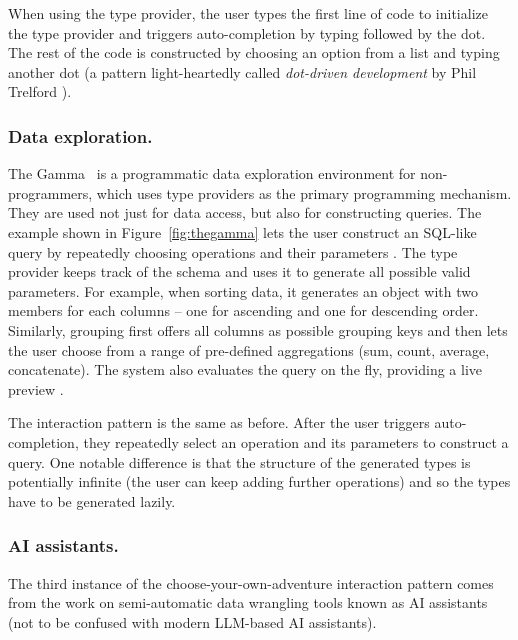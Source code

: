 \documentclass[nonacm,anonymous,sigplan,screen]{acmart}
\newcommand{\ident}[1]{\textsf{\color{DarkSlateBlue}{#1}}}
\begin{document}
When using the type provider, the user types the first line of code to initialize the type provider
and triggers auto-completion by typing \ident{wb} followed by the dot. The rest of the code is
constructed by choosing an option from a list and typing another dot (a pattern light-heartedly
called \emph{dot-driven development} by Phil Trelford \cite{seemann-2021-head}).


\subsubsection*{Data exploration.}

The Gamma~\cite{petricek-2022-thegamma} is a programmatic data exploration environment
for non-programmers, which uses type providers as the primary programming mechanism. They
are used not just for data access, but also for constructing queries.
The example shown in Figure~\ref{fig:thegamma} lets the user construct an SQL-like query by
repeatedly choosing operations and their parameters \cite{petricek-2017-dotdriven}. The type provider keeps track
of the schema and uses it to generate all possible valid parameters. For example, when sorting data, it generates
an object with two members for each columns -- one for ascending and one for descending order.
Similarly, grouping first offers all columns as possible grouping keys and then
lets the user choose from a range of pre-defined aggregations (sum, count, average, concatenate).
The system also evaluates the query on the fly, providing a live preview \cite{petricek-2020-live}.

The interaction pattern is the same as before. After the user triggers auto-completion, they
repeatedly select an operation and its parameters to construct a query. One notable difference
is that the structure of the generated types is potentially infinite (the user can keep adding
further operations) and so the types have to be generated lazily.


\subsubsection*{AI assistants.}

The third instance of the choose-your-own-adventure interaction pattern comes from the work on
semi-automatic data wrangling tools known as AI assistants \cite{petricek-2023-aias} (not to be
confused with modern LLM-based AI assistants).
\end{document}
